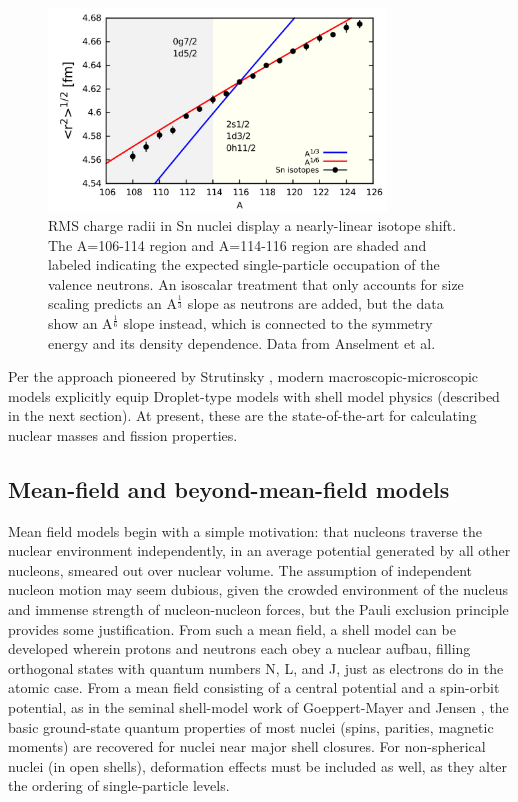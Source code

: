 \begin{figure}
    \centering
    \includegraphics[width=0.8\textwidth]{figures/SnIsotopeRMSRadii.png}
    \caption{RMS charge radii in Sn nuclei display a nearly-linear isotope
    shift. The A=106-114 region and A=114-116 region are shaded and labeled
    indicating the expected single-particle occupation of the valence neutrons.
    An isoscalar treatment that only accounts for size scaling predicts an
    A$^{\frac{1}{3}}$ slope as neutrons are added, but the data show an
A$^{\frac{1}{6}}$ slope instead, which is connected to the symmetry energy
and its density dependence. Data from Anselment et al. \cite{Anselment1986}}
    \label{SnIsotopeShift}
\end{figure}

Per the approach pioneered by Strutinsky \cite{Strutinsky1967, Seeger1975},
modern macroscopic-microscopic models \cite{Moller1988, Wang2015} explicitly equip Droplet-type models
with shell model physics (described in the next section). At present, these are the state-of-the-art
for calculating nuclear masses and fission properties.

\subsection{Mean-field and beyond-mean-field models}
Mean field models begin with a simple motivation: that nucleons
traverse the nuclear environment independently, in an average
potential generated by all other nucleons, smeared out over nuclear volume.
The assumption of independent nucleon motion may seem dubious, given the
crowded environment of the nucleus and immense strength of nucleon-nucleon forces,
but the Pauli exclusion principle provides some justification.
From such a mean field, a shell model can be developed wherein protons and neutrons each
obey a nuclear aufbau, filling orthogonal states with quantum numbers N, L, and J, just as electrons do in the atomic 
case. From a mean field consisting of a central
potential and a spin-orbit potential, as in the seminal shell-model work of Goeppert-Mayer
and Jensen \cite{GoeppertMayer1955}, the basic ground-state quantum properties of most nuclei
(spins, parities, magnetic moments) are recovered for nuclei near major shell closures. For non-spherical nuclei (in open shells),
deformation effects must be included as well, as they alter the ordering of single-particle levels.


